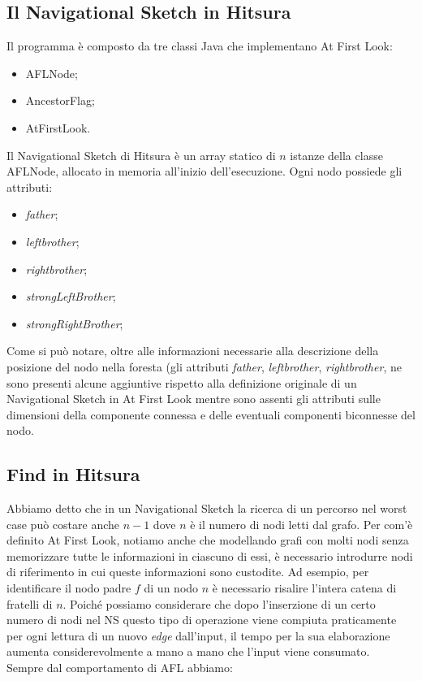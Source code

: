 \documentclass[a4paper,11pt]{report}
\begin{document}
\subsection{Il Navigational Sketch in Hitsura}\label{Il Navigational Sketch in Hitsura}
Il programma è composto da tre classi Java che implementano At First Look:
\begin{itemize}
 \item AFLNode;
 \item AncestorFlag;
 \item AtFirstLook.
\end{itemize}
Il Navigational Sketch di Hitsura è un array statico di $n$ istanze della classe AFLNode, allocato in memoria all'inizio dell'esecuzione.
Ogni nodo possiede gli attributi:
\begin{itemize}
 \item \emph{father};
 \item \emph{left\textunderscore brother};
 \item \emph{right\textunderscore brother};
 \item \emph{strongLeftBrother};
 \item \emph{strongRightBrother};
\end{itemize}
Come si può notare, oltre alle informazioni necessarie alla descrizione della posizione del nodo nella foresta (gli attributi \emph{father},
\emph{left\textunderscore brother}, \emph{right\textunderscore brother}, ne sono presenti alcune aggiuntive rispetto alla definizione
originale di un Navigational
Sketch in At First Look mentre sono assenti gli attributi sulle dimensioni della componente connessa e delle eventuali componenti biconnesse
del nodo.

\subsection{Find in Hitsura}
Abbiamo detto che in un Navigational Sketch la ricerca di un percorso nel worst case può costare anche $n-1$ dove $n$ è il numero di nodi
letti dal grafo. 
Per com'è definito At First Look, notiamo anche che modellando grafi con molti nodi senza memorizzare tutte le informazioni in ciascuno di
essi,
è necessario introdurre nodi di riferimento in cui queste informazioni sono custodite. Ad esempio, per identificare il nodo padre $f$ di un
nodo $n$ è necessario
risalire l'intera catena di fratelli di $n$. Poiché possiamo considerare che dopo l'inserzione di un certo numero di nodi nel NS questo tipo
di operazione viene compiuta praticamente 
per ogni lettura di un nuovo \emph{edge} dall'input, il tempo per la sua elaborazione aumenta considerevolmente a mano a mano che l'input
viene consumato.\\
Sempre dal comportamento di AFL abbiamo:
\end{document}
